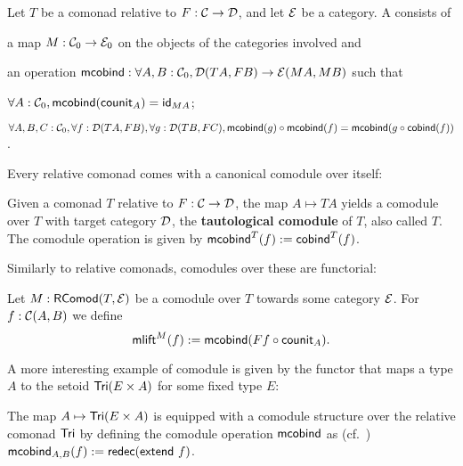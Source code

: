 \documentclass[envcountsame]{llncs}
\begin{document}
\begin{definition}%
\label{def:comodule}
 Let $T$ be a comonad relative to $F:\C\to\D$, and let $\E$ be a category.
 A  consists of
   \begin{packitem}
   \item a map $M:\C_0 \to \E_0$ on the objects of the categories involved and
   \item an operation $\mcobind: \forall A,B:\C_0, \D(TA,FB) \to \E(MA,MB)$ such that
   \item $\forall A : \C_0, \mcobind(\counit_A) = \id_{MA}$;
   \item $\forall A,B,C:\C_0, \forall f : \D(TA,FB),\forall g:\D(TB,FC), \\
        \comp{\mcobind(f)}{\mcobind(g)} = \mcobind(\comp{\cobind(f)}{g})$ .
  \end{packitem}

\end{definition}




Every relative comonad comes with a canonical comodule over itself:

\begin{definition}%
\label{def:tautological_comodule}
  Given a comonad $T$ relative to $F:\C\to\D$, the map $A \mapsto TA$ yields a comodule over $T$ 
  with target category $\D$, the \textbf{tautological comodule} of $T$, also called $T$.
  The comodule operation is given by
    $  \mcobind^T(f) := \cobind^T(f)$. 
\end{definition}




\begin{Long}
Similarly to relative comonads, comodules over these are functorial:
\begin{definition}%
\label{def:comodule_lift}
 Let $M : \RComod(T,\E)$ be a comodule over $T$ towards some category $\E$. For $f : \C(A,B)$ we define
  \[ \mlift^M(f) := \mcobind(\comp{\counit_A}{Ff}) .  \]
\end{definition}
\end{Long}

A more interesting example of comodule is given by the functor that maps a type $A$ to the setoid $\Tri(E\times A)$
for some fixed type $E$:
\begin{example}\label{ex_tri_prod_comod}
   The map $A \mapsto \Tri(E\times A)$ is equipped with a comodule structure over the relative comonad $\Tri$ by
   defining the comodule operation $\mcobind$ as (cf.\ )
     $ \mcobind_{A,B} (f) := \redec (\extend~f)$.
\end{example}
\end{document}

